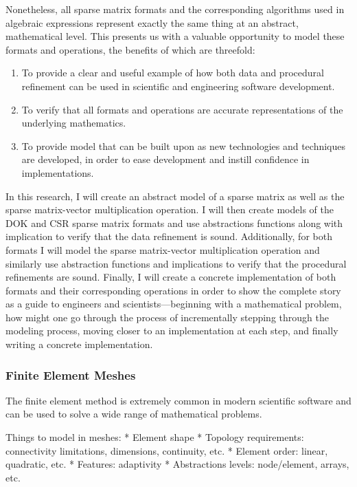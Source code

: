 \documentclass[../../proposal.tex]{subfiles}
\begin{document}
Nonetheless, all sparse matrix formats and the corresponding algorithms used in algebraic expressions represent exactly the same thing at an abstract, mathematical level.  This presents us with a valuable opportunity to model these formats and operations, the benefits of which are threefold: 

\begin{enumerate}
	\item To provide a clear and useful example of how both data and procedural refinement can be used in scientific and engineering software development.
	\item To verify that all formats and operations are accurate representations of the underlying mathematics.
	\item To provide model that can be built upon as new technologies and techniques are developed, in order to ease development and instill confidence in implementations.
\end{enumerate}

In this research, I will create an abstract model of a sparse matrix as well as the sparse matrix-vector multiplication operation.  I will then create models of the DOK and CSR sparse matrix formats and use abstractions functions along with implication to verify that the data refinement is sound.  Additionally, for both formats I will model the sparse matrix-vector multiplication operation and similarly use abstraction functions and implications to verify that the procedural refinements are sound.  Finally, I will create a concrete implementation of both formats and their corresponding operations in order to show the complete story as a guide to engineers and scientists---beginning with a mathematical problem, how might one go through the process of incrementally stepping through the modeling process, moving closer to an implementation at each step, and finally writing a concrete implementation.

\subsubsection{Finite Element Meshes}

The finite element method is extremely common in modern scientific software and can be used to solve a wide range of mathematical problems.

Things to model in meshes:
* Element shape
* Topology requirements: connectivity limitations, dimensions, continuity, etc.
* Element order: linear, quadratic, etc.
* Features: adaptivity
* Abstractions levels: node/element, arrays, etc.
\end{document}
